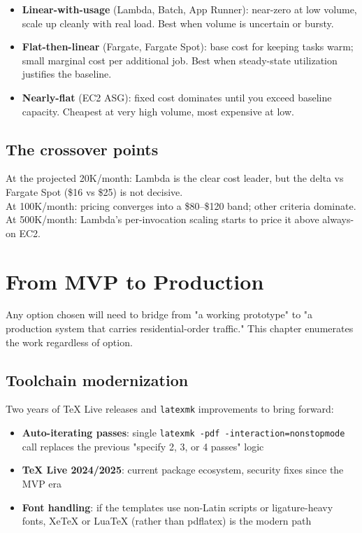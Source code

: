 \documentclass[11pt,letterpaper]{article}
\begin{document}
\begin{itemize}[nosep]
  \item \textbf{Linear-with-usage} (Lambda, Batch, App Runner): near-zero at low volume, scale up cleanly with real load. Best when volume is uncertain or bursty.
  \item \textbf{Flat-then-linear} (Fargate, Fargate Spot): base cost for keeping tasks warm; small marginal cost per additional job. Best when steady-state utilization justifies the baseline.
  \item \textbf{Nearly-flat} (EC2 ASG): fixed cost dominates until you exceed baseline capacity. Cheapest at very high volume, most expensive at low.
\end{itemize}

\subsection{The crossover points}
At the projected 20K/month: Lambda is the clear cost leader, but the delta vs Fargate Spot (\$16 vs \$25) is not decisive.\\
At 100K/month: pricing converges into a \$80--\$120 band; other criteria dominate.\\
At 500K/month: Lambda's per-invocation scaling starts to price it above always-on EC2.

\newpage

\section{From MVP to Production}
\label{sec:mvp-to-prod}

Any option chosen will need to bridge from "a working prototype" to "a production system that carries residential-order traffic." This chapter enumerates the work regardless of option.

\subsection{Toolchain modernization}
Two years of TeX Live releases and \texttt{latexmk} improvements to bring forward:

\begin{itemize}[nosep]
  \item \textbf{Auto-iterating passes}: single \texttt{latexmk -pdf -interaction=nonstopmode} call replaces the previous "specify 2, 3, or 4 passes" logic
  \item \textbf{TeX Live 2024/2025}: current package ecosystem, security fixes since the MVP era
  \item \textbf{Font handling}: if the templates use non-Latin scripts or ligature-heavy fonts, XeTeX or LuaTeX (rather than pdflatex) is the modern path
\end{itemize}
\end{document}
